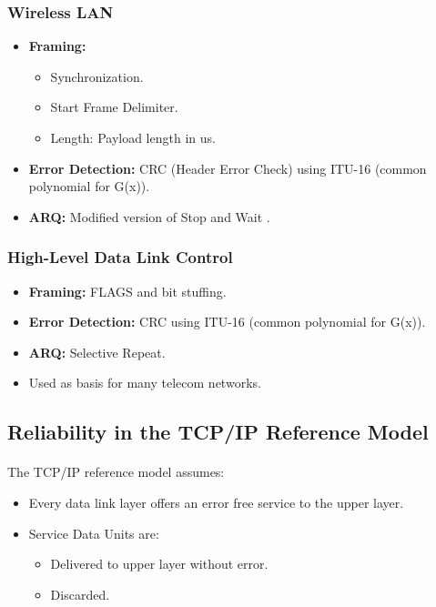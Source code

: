 \documentclass[../resumosRCOM.tex]{subfiles}
\begin{document}
\subsubsection{Wireless LAN}
\begin{itemize}
    \item \textbf{Framing:}
    \begin{itemize}
        \item Synchronization.
        \item Start Frame Delimiter.
        \item Length: Payload length in us.
    \end{itemize}
    \item \textbf{Error Detection:} CRC (Header Error Check) using ITU-16 (common polynomial for G(x)).
    \item \textbf{ARQ:} Modified version of Stop and Wait .
\end{itemize}
\subsubsection{High-Level Data Link Control}
\begin{itemize}
    \item \textbf{Framing:} FLAGS and bit stuffing.
    \item \textbf{Error Detection:} CRC using ITU-16 (common polynomial for G(x)).
    \item \textbf{ARQ:} Selective Repeat.
    \item Used as basis for many telecom networks.
\end{itemize}



\subsection{Reliability in the TCP/IP Reference Model}
\paragraph{}
The TCP/IP reference model assumes:
\begin{itemize}
    \item Every data link layer offers an error free service to the upper layer.
    \item Service Data Units are:
    \begin{itemize}
        \item Delivered to upper layer without error.
        \item Discarded.
    \end{itemize} 
\end{itemize}
\end{document}

